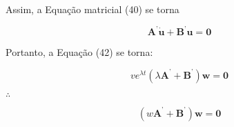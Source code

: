 \documentclass[a4paper,12p]{article}
\begin{document}
	Assim, a Equação matricial (40) se torna
	
	\begin{equation}
	\textbf{A}^{\textbf{'}}\dot{\textbf{u}} + \textbf{B}^{\textbf{'}}{\textbf{u}} = \textbf{0}
	\end{equation}
	
	Portanto, a Equação (42) se torna:

	\begin{equation}
	v e^{\lambda t}(\lambda\textbf{A}^{\textbf{'}} 
	+ \textbf{B}^{\textbf{'}}){\textbf{w}} = \textbf{0}
	\end{equation}
	\begin{center}
	$\therefore$
	\end{center}
	\begin{equation}
	(w\textbf{A}^{\textbf{'}} 
	+ \textbf{B}^{\textbf{'}}){\textbf{w}} = \textbf{0}
	\end{equation}
	
\end{document}

